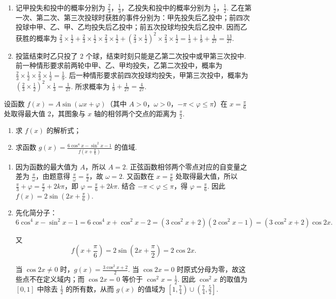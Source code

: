 \begin{solution}
\begin{enumerate}
\item 记甲投失和投中的概率分别为 \(\frac{2}{3}\)，\(\frac{1}{3}\)，乙投失和投中的概率分别为 \(\frac{1}{2}\)，\(\frac{1}{2}\). 乙在第一次、第二次、第三次投球时获胜的事件分别为：甲先投失后乙投中；前四次投球中甲、乙、甲、乙均投失后乙投中；前五次投球均投失后乙投中. 因而乙获胜的概率为 \(\frac{2}{3}\times\frac{1}{2}+\frac{2}{3}\times\frac{1}{2}\times\frac{2}{3}\times\frac{1}{2}+\left(\frac{2}{3}\times\frac{1}{2}\right)^2\times\frac{2}{3}\times\frac{1}{2}=\frac{1}{3}+\frac{1}{9}+\frac{1}{27}=\frac{13}{27}\).
\item 投篮结束时乙只投了 \(2\) 个球，结束时刻只能是乙第二次投中或甲第三次投中. 前一种情形要求前两轮中甲、乙、甲均投失，乙第二次投中，概率为 \(\frac{2}{3}\times\frac{1}{2}\times\frac{2}{3}\times\frac{1}{2}=\frac{1}{9}\). 后一种情形要求前四次投球均投失，甲第三次投中，概率为 \(\left(\frac{2}{3}\times\frac{1}{2}\right)^2\times\frac{1}{3}=\frac{1}{27}\). 所求概率为 \(\frac{1}{9}+\frac{1}{27}=\frac{4}{27}\).
\end{enumerate}
\end{solution}

\begin{problem}
设函数 \(f(x)=A\sin(\omega x+\varphi)\)（其中 \(A>0\)，\(\omega>0\)，\(-\pi<\varphi\leqslant \pi\)）在 \(x=\frac{\pi}{6}\) 处取得最大值 2，其图象与 \(x\) 轴的相邻两个交点的距离为 \(\frac{\pi}{2}\).

\begin{enumerate}
\item 求 \(f(x)\) 的解析式；
\item 求函数 \(g(x)=\frac{6\cos^{4}x-\sin^{2}x-1}{f\left(x+\frac{\pi}{6}\right)}\) 的值域.
\end{enumerate}
\end{problem}

\begin{solution}
\begin{enumerate}
\item 因为函数的最大值为 \(A\)，所以 \(A=2\). 正弦函数相邻两个零点对应的自变量之差为 \(\frac{\pi}{\omega}\)，由题意得 \(\frac{\pi}{\omega}=\frac{\pi}{2}\)，故 \(\omega=2\). 又函数在 \(x=\frac{\pi}{6}\) 处取得最大值，所以 \(\frac{\pi}{3}+\varphi=\frac{\pi}{2}+2k\pi\)，即 \(\varphi=\frac{\pi}{6}+2k\pi\). 结合 \(-\pi<\varphi\leqslant\pi\)，得 \(\varphi=\frac{\pi}{6}\). 因此 \(f(x)=2\sin\left(2x+\frac{\pi}{6}\right)\).
\item 先化简分子：\[
6\cos^4x-\sin^2x-1=6\cos^4x+\cos^2x-2=(3\cos^2x+2)(2\cos^2x-1)=(3\cos^2x+2)\cos 2x.
\]

又 \[
f\left(x+\frac{\pi}{6}\right)=2\sin\left(2x+\frac{\pi}{2}\right)=2\cos 2x.
\]

当 \(\cos 2x\ne0\) 时，\(g(x)=\frac{3\cos^2x+2}{2}\). 当 \(\cos 2x=0\) 时原式分母为零，故这些点不在定义域内；而 \(\cos 2x=0\) 等价于 \(\cos^2x=\frac{1}{2}\). 因此 \(\cos^2x\) 的取值为 \([0,1]\) 中除去 \(\frac{1}{2}\) 的所有数，从而 \(g(x)\) 的值域为 \(\left[1,\frac{7}{4}\right)\cup\left(\frac{7}{4},\frac{5}{2}\right]\).
\end{enumerate}
\end{solution}

